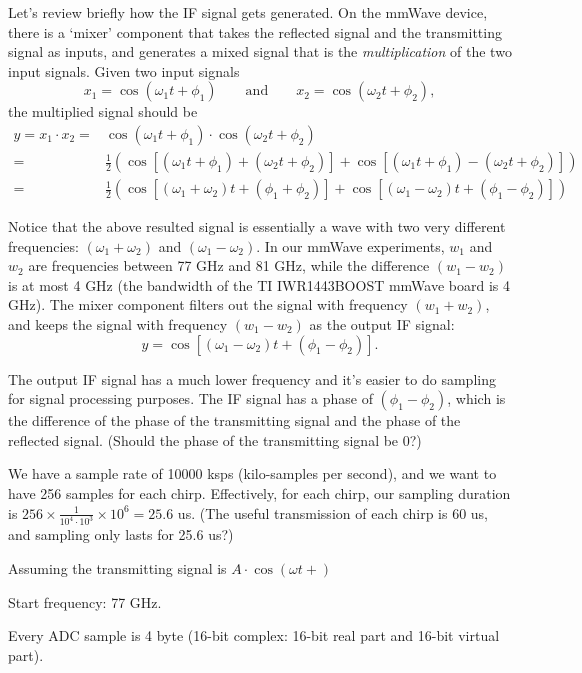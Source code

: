 \documentclass[11pt, oneside]{article}   	%
\begin{document}
Let's review briefly how the IF signal gets generated. On the mmWave device, there is a `mixer'  component that takes the reflected signal and the transmitting signal as inputs, and generates a mixed signal that is the \emph{multiplication} of the two input signals. Given two input signals 
$$x_1 = \cos(\omega_1 t + \phi_1) \qquad \text{and}\qquad x_2 = \cos(\omega_2 t + \phi_2),$$
the multiplied signal should be 
\begin{align*}
y = x_1 \cdot x_2  = & \cos(\omega_1 t + \phi_1) \cdot \cos(\omega_2 t + \phi_2) \\
= & \frac{1}{2}\left(\cos\left[(\omega_1 t +\phi_1)+ (\omega_2 t +\phi_2)\right]+ \cos\left[(\omega_1 t +\phi_1)- (\omega_2 t +\phi_2)\right]\right)\\
= & \frac{1}{2}\left(\cos\left[(\omega_1 +\omega_2) t + (\phi_1 +\phi_2)\right]+ \cos\left[(\omega_1 - \omega_2) t + (\phi_1 - \phi_2)\right]\right)
\end{align*}

Notice that the above resulted signal is essentially a wave with two very different frequencies: $(\omega_1 + \omega_2)$ and $(\omega_1 - \omega_2)$. In our mmWave experiments, $w_1$ and $w_2$ are frequencies between 77 GHz and 81 GHz, while the difference $(w_1 - w_2)$ is at most 4 GHz (the bandwidth of the TI IWR1443BOOST mmWave board is 4 GHz). The mixer component filters out the signal with frequency $(w_1 + w_2)$, and keeps the signal with frequency  $(w_1 - w_2)$ as the output IF signal:
$$y = \cos\left[(\omega_1 - \omega_2) t + (\phi_1 - \phi_2)\right].$$

The output IF signal has a much lower frequency and it's easier to do sampling for signal processing purposes. The IF signal has a phase of $(\phi_1 - \phi_2)$, which is the difference of the phase of the transmitting signal and the phase of the reflected signal. (Should the phase of the transmitting signal be 0?)

We have a sample rate of 10000 ksps (kilo-samples per second), and we want to have 256 samples for each chirp. Effectively, for each chirp, our sampling duration is $256\times\frac{1}{10^4\cdot 10^3}\times 10^6 = 25.6$ us. (The useful transmission of each chirp is 60 us, and sampling only lasts for 25.6 us?)

Assuming the transmitting signal is $A\cdot \cos(\omega t + )$

Start frequency: 77 GHz.

Every ADC sample is 4 byte (16-bit complex: 16-bit real part and 16-bit virtual part).
\end{document}
